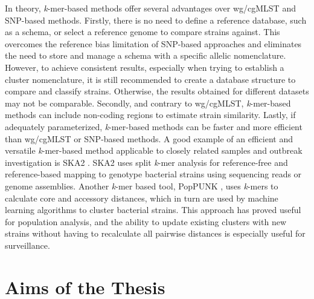 In theory, \textit{k}-mer-based methods offer several advantages over \ac{wg/cgMLST} and \ac{SNP}-based methods. Firstly, there is no need to define a reference database, such as a schema, or select a reference genome to compare strains against. This overcomes the reference bias limitation of \ac{SNP}-based approaches and eliminates the need to store and manage a schema with a specific allelic nomenclature. However, to achieve consistent results, especially when trying to establish a cluster nomenclature, it is still recommended to create a database structure to compare and classify strains. Otherwise, the results obtained for different datasets may not be comparable. Secondly, and contrary to \ac{wg/cgMLST}, \textit{k}-mer-based methods can include non-coding regions to estimate strain similarity. Lastly, if adequately parameterized, \textit{k}-mer-based methods can be faster and more efficient than \ac{wg/cgMLST} or \ac{SNP}-based methods. A good example of an efficient and versatile \textit{k}-mer-based method applicable to closely related samples and outbreak investigation is SKA2 \cite{derelle_seamless_2024}. SKA2 uses split \textit{k}-mer analysis for reference-free and reference-based mapping to genotype bacterial strains using sequencing reads or genome assemblies. Another \textit{k}-mer based tool, PopPUNK \cite{lees_fast_2019}, uses \textit{k}-mers to calculate core and accessory distances, which in turn are used by machine learning algorithms to cluster bacterial strains. This approach has proved useful for population analysis, and the ability to update existing clusters with new strains without having to recalculate all pairwise distances is especially useful for surveillance.


\section{Aims of the Thesis}

